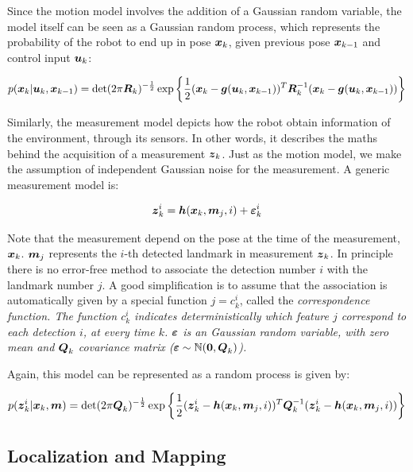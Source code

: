 Since the motion model involves the addition of a Gaussian random variable, the model itself can be seen as a Gaussian random process, which represents the probability of the robot to end up in pose $\boldsymbol{x}_k$, given previous pose $\boldsymbol{x}_{k-1}$ and control input $\boldsymbol{u}_k$:

\begin{equation}
p(\boldsymbol{x}_k|\boldsymbol{u}_k,\boldsymbol{x}_{k-1}) = \det(2\pi \boldsymbol{R}_k)^{-\frac{1}{2}}\exp\left\lbrace \frac{1}{2}(\boldsymbol{x}_k-\boldsymbol{g}(\boldsymbol{u}_k,\boldsymbol{x}_{k-1}))^T
\boldsymbol{R}_k^{-1}(\boldsymbol{x}_k-\boldsymbol{g}(\boldsymbol{u}_k,\boldsymbol{x}_{k-1}))\right\rbrace
\label{eq:motion-pdf}
\end{equation}

Similarly, the measurement model depicts how the robot obtain information of the environment, through its sensors. In other words, it describes the maths behind the acquisition of a measurement $\boldsymbol{z}_k$. Just as the motion model, we make the assumption of independent Gaussian noise for the measurement. A generic measurement model is:

\begin{equation}
\boldsymbol{z}_k^i = \boldsymbol{h}(\boldsymbol{x}_k,\boldsymbol{m}_j,i) + \boldsymbol{\varepsilon}_k^i
\end{equation} 

\noindent
Note that the measurement depend on the pose at the time of the measurement, $\boldsymbol{x}_k$. $\boldsymbol{m}_j$ represents the $i$-th detected landmark in measurement $\boldsymbol{z}_k$. In principle there is no error-free method to associate the detection number $i$ with the landmark number $j$. A good simplification is to assume that the association is automatically given by a special function $j=c_k^i$, called the \it{correspondence function}. The function $c_k^i$ indicates deterministically which feature $j$ correspond to each detection $i$, at every time $k$. $\boldsymbol{\varepsilon}$ is an Gaussian random variable, with zero mean and $\boldsymbol{Q}_k$ covariance matrix ($\boldsymbol{\varepsilon} \sim \mathbb{N}(\boldsymbol{0},\boldsymbol{Q}_k)$).

Again, this model can be represented as a random process is given by:

\begin{equation}
p(\boldsymbol{z}_k^i|\boldsymbol{x}_k,\boldsymbol{m}) = \det(2\pi \boldsymbol{Q}_k)^{-\frac{1}{2}}\exp\left\lbrace \frac{1}{2}(\boldsymbol{z}_k^i-\boldsymbol{h}(\boldsymbol{x}_k,\boldsymbol{m}_j,i))^T
\boldsymbol{Q}_k^{-1}(\boldsymbol{z}_k^i-\boldsymbol{h}(\boldsymbol{x}_k,\boldsymbol{m}_j,i))\right\rbrace 
\label{eq:measure-pdf}
\end{equation}

\subsection{Localization and Mapping}

